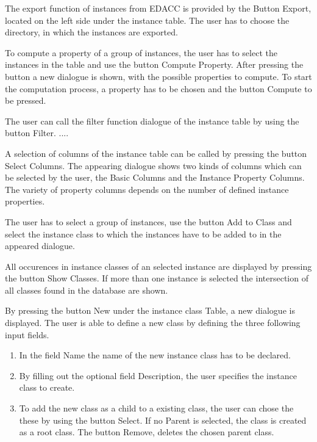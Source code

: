  The export function of instances from EDACC is provided by the Button Export, located on the left side under the instance table. The user has to choose the directory, in which the instances are exported.

 To compute a property of a group of instances, the user has to select the instances in the table and use the button Compute Property. After pressing the button a new dialogue is shown, with the possible properties to compute. To start the computation process, a property has to be chosen and the button Compute to be pressed.

 The user can call the filter function dialogue of the instance table by using the button Filter. ....

 A selection of columns of the instance table can be called by pressing the button Select Columns. The appearing dialogue shows two kinds of columns which can be selected by the user, the Basic Columns and the Instance Property Columns. The variety of property columns depends on the number of defined instance properties.  

 The user has to select a group of instances, use the button Add to Class and select the instance class to which the instances have to be added to in the appeared dialogue.

 All occurences in instance classes of an selected instance are displayed by pressing the button Show Classes. If more than one instance is selected the intersection of all classes found in the database are shown.

\label{createInstanceClass} By pressing the button New under the instance class Table, a new dialogue is displayed. The user is able to define a new class by defining the three following input fields.
\begin{enumerate}
	\item In the field Name the name of the new instance class has to be declared.
	\item By filling out the optional field Description, the user specifies the instance class to create.
	\item To add the new class as a child to a existing class, the user can chose the these by using the button Select. If no Parent is selected, the class is created as a root class. The button Remove, deletes the chosen parent class.
\end{enumerate}

